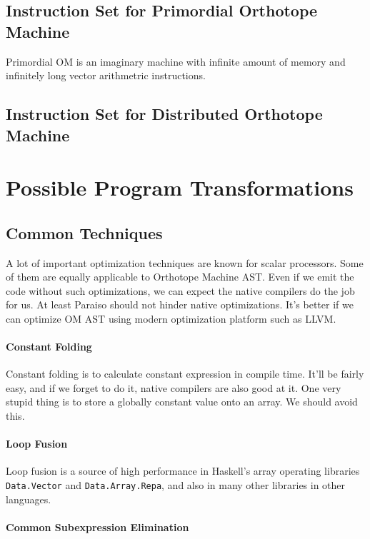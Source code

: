 \documentclass[twocolumn]{article}
\begin{document}
\subsection{Instruction Set for Primordial Orthotope Machine}
Primordial OM is an imaginary machine with infinite amount of memory and
infinitely long vector arithmetric instructions. 
\subsection{Instruction Set for Distributed Orthotope Machine}

\section{Possible Program Transformations}
\subsection{Common Techniques}
A lot of important optimization techniques are known for scalar
processors. Some of them are equally applicable to Orthotope Machine
AST.  Even if we emit the code without such optimizations, we can
expect the native compilers do the job for us. At least Paraiso should
not hinder native optimizations. It's better if we can optimize OM AST
using modern optimization platform such as LLVM.

\paragraph{Constant Folding}
Constant folding is to calculate constant expression in compile
time. It'll be fairly easy, and if we forget to do it, native
compilers are also good at it. One very stupid thing is to store a
globally constant value onto an array. We should avoid this.

\paragraph{Loop Fusion}

Loop fusion is a source of high performance in Haskell's array operating
libraries {\tt Data.Vector} and {\tt Data.Array.Repa}, and also in many other
libraries in other languages.


\paragraph{Common Subexpression Elimination}
\end{document}
